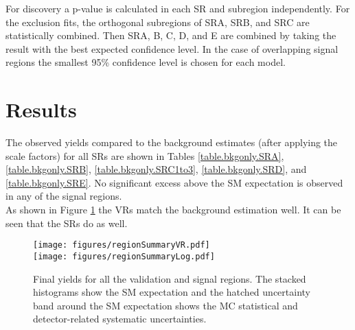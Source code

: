 \clearpage

%
%
%

For discovery a p-value is calculated in each SR and subregion independently.  For the exclusion fits, the orthogonal subregions of SRA, SRB, and SRC are statistically combined.  Then SRA, B, C, D, and E are combined by taking the result with the best expected confidence level. In the case of overlapping signal regions the smallest 95\% confidence level is chosen for each model.

\section{Results}
\label{sec:results}



The observed yields compared to the background estimates (after applying the scale factors) for all SRs are shown in Tables \ref{table.bkgonly.SRA}, \ref{table.bkgonly.SRB}, \ref{table.bkgonly.SRC1to3}, \ref{table.bkgonly.SRD}, and \ref{table.bkgonly.SRE}.  No significant excess above the SM expectation is observed in any of the signal regions. \\

As shown in Figure \ref{fig:srSum} the VRs match the background estimation well.  It can be seen that the SRs do as well.


\begin{figure}[!hp] 
\begin{center}
 \texttt{[image: figures/regionSummaryVR.pdf]}\\ %
 \texttt{[image: figures/regionSummaryLog.pdf]}%
    \caption[Final yields for all the validation and signal regions]{Final yields for all the validation and signal regions. The stacked histograms show the SM expectation and the hatched uncertainty band around the SM expectation shows the MC statistical and detector-related systematic uncertainties.}
    \label{fig:srSum}
\end{center}
\end{figure}
\clearpage


